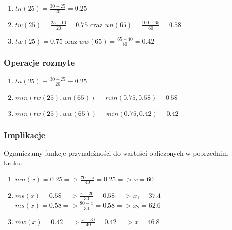 \documentclass{article}
\begin{document}
\begin{enumerate}[label=Reguła \arabic*:, leftmargin=*]
    \item $tn(25) = \frac{30 - 25}{20} = 0.25$
    \item $tw(25) = \frac{25 - 10}{20} = 0.75$ oraz $wn(65) = \frac{100 - 65}{60} = 0.58$
    \item $tw(25) = 0.75$ oraz $ww(65) = \frac{65 - 40}{60} = 0.42$
\end{enumerate}

\subsubsection*{Operacje rozmyte}

\begin{enumerate}[label=Reguła \arabic*:, leftmargin=*]
    \item $tn(25) = \frac{30 - 25}{20} = 0.25$
    \item $min(tw(25), wn(65)) = min(0.75, 0.58) = 0.58$
    \item $min(tw(25), ww(65)) = min(0.75, 0.42) = 0.42$
\end{enumerate}

\subsubsection*{Implikacje}
Ograniczamy funkcje przynależności do wartości obliczonych 
w poprzednim kroku.
\begin{enumerate}[label=Reguła \arabic*:, leftmargin=*]
    \item $mn(x) = 0.25 => \frac{70 - x}{40} = 0.25 => x = 60$
    \item $ms(x) = 0.58 => \frac{x - 20}{30} = 0.58 => x_1 = 37.4$\\
          $ms(x) = 0.58 => \frac{80 - x}{30} = 0.58 => x_2 = 62.6$
    \item $mw(x) = 0.42 => \frac{x - 30}{40} = 0.42 => x = 46.8$
\end{enumerate}
\end{document}
